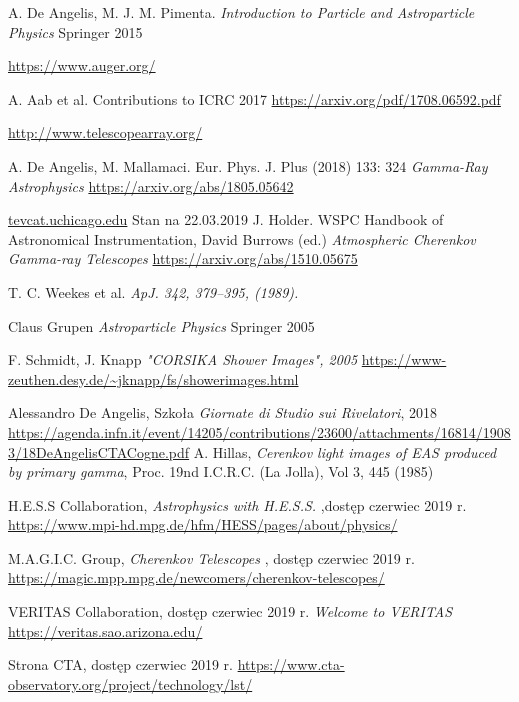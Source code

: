 \documentclass[a4paper,11pt,twoside]{article}
\begin{document}
\begin{thebibliography}{9}
A. De Angelis, M. J. M. Pimenta.
\textit{Introduction to Particle and Astroparticle Physics} Springer 2015

\url{https://www.auger.org/}

A. Aab et al. Contributions to ICRC 2017 
\url{https://arxiv.org/pdf/1708.06592.pdf}

\url{http://www.telescopearray.org/}

A. De Angelis, M. Mallamaci.
Eur. Phys. J. Plus (2018) 133: 324
\textit{Gamma-Ray Astrophysics} 
\url{https://arxiv.org/abs/1805.05642}

\url{tevcat.uchicago.edu}
Stan na 22.03.2019
J. Holder.  WSPC Handbook of Astronomical Instrumentation, David Burrows (ed.)
\textit{Atmospheric Cherenkov Gamma-ray Telescopes}
\url{https://arxiv.org/abs/1510.05675}

T. C. Weekes et al.
\textit{ApJ. 342, 379–395, (1989).}

Claus Grupen
\textit{Astroparticle Physics} Springer 2005

F. Schmidt, J. Knapp
\textit{"CORSIKA Shower Images", 2005}
\url{https://www-zeuthen.desy.de/~jknapp/fs/showerimages.html}

Alessandro De Angelis, Szkoła \textsl{
Giornate di Studio sui Rivelatori}, 2018 
\url{https://agenda.infn.it/event/14205/contributions/23600/attachments/16814/19083/18DeAngelisCTACogne.pdf}
A. Hillas, 
\textit{Cerenkov light images of EAS produced by primary gamma},
Proc. 19nd I.C.R.C. (La Jolla), Vol 3, 445 (1985)

H.E.S.S  Collaboration,
\textit{Astrophysics with H.E.S.S.}
,dostęp czerwiec 2019 r. 
\url{https://www.mpi-hd.mpg.de/hfm/HESS/pages/about/physics/}

 M.A.G.I.C.  Group,
\textit{Cherenkov Telescopes}
, dostęp czerwiec 2019 r. 
\url{https://magic.mpp.mpg.de/newcomers/cherenkov-telescopes/}

VERITAS Collaboration, dostęp czerwiec 2019 r. 
\textit{Welcome to VERITAS }
\url{https://veritas.sao.arizona.edu/}


Strona CTA, dostęp czerwiec 2019 r.
\url{https://www.cta-observatory.org/project/technology/lst/}


\end{thebibliography}
\end{document}
